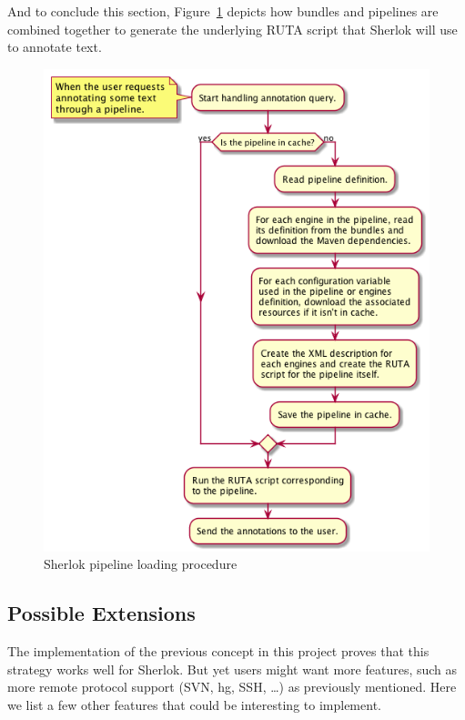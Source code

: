 \documentclass{article}
\begin{document}
And to conclude this section, Figure~\ref{fig:sherlok_load_pipeline} depicts how bundles and pipelines
are combined together to generate the underlying RUTA script that Sherlok will use to annotate text.

\begin{figure}
    \centering
    \includegraphics[width=\linewidth]{res/sherlok_load_pipeline.png}
    \caption{Sherlok pipeline loading procedure}
    \label{fig:sherlok_load_pipeline}
\end{figure}

\subsection{Possible Extensions}

The implementation of the previous concept in this project proves that this strategy works well for
Sherlok. But yet users might want more features, such as more remote protocol support (SVN, hg, SSH,
\dots) as previously mentioned. Here we list a few other features that could be interesting to
implement.
\end{document}
